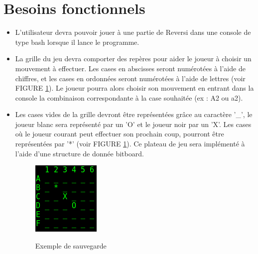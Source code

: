 \documentclass[10pt, a4paper]{article}
\begin{document}
\section {Besoins fonctionnels}
\begin {itemize}
\item L'utilisateur devra pouvoir jouer à une partie de Reversi dans une console de type bash lorsque il lance le programme.
\item La grille du jeu devra comporter des repères pour aider le joueur à choisir un mouvement à effectuer. Les cases en abscisses seront numérotées à l'aide de chiffres, et les cases en ordonnées seront numérotées à l'aide de lettres (voir FIGURE \ref{exemple_board}). Le joueur pourra alors choisir son mouvement en entrant dans la console la combinaison correspondante à la case souhaitée (ex : A2 ou a2).
\item Les cases vides de la grille devront être représentées grâce au caractère '\_', le joueur blanc sera représenté par un 'O' et le joueur noir par un 'X'. Les cases où le joueur courant peut effectuer son prochain coup, pourront être représentées par '*' (voir FIGURE \ref{exemple_board}). Ce plateau de jeu sera implémenté à l'aide d'une structure de donnée bitboard.
  \begin {figure}[H]
    \centering
    \includegraphics [scale = 0.5]{images/exemple_board.png}
    \label {exemple_board}
    \caption {Exemple de sauvegarde}
  \end   {figure}
  

\end{itemize}
\end{document}
